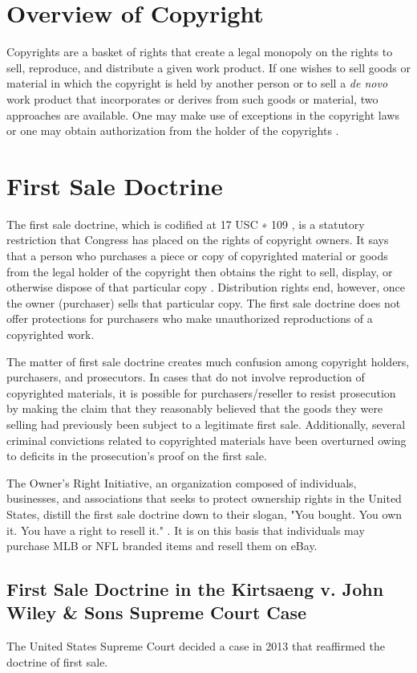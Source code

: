 \documentclass[letterpaper,11pt]{texMemo}
\begin{document}
\section*{Overview of Copyright}
  Copyrights are a basket of rights that create a legal monopoly on the rights to sell, reproduce, and distribute a given work product. If one wishes to sell goods or material in which the copyright is held by another person or to sell a \emph{de novo} work product that incorporates or derives from such goods or material, two approaches are available. One may make use of exceptions in the copyright laws or one may obtain authorization from the holder of the copyrights \cite{carnes}.

\section*{First Sale Doctrine}
  The first sale doctrine, which is codified at 17 USC \textsection∗ 109 \cite{17usc109}, is a statutory restriction that Congress has placed on the rights of copyright owners. It says that a person who purchases a piece or copy of copyrighted material or goods from the legal holder of the copyright then obtains the right to sell, display, or otherwise dispose of that particular copy \cite{crm1854}. Distribution rights end, however, once the owner (purchaser) sells that particular copy. The first sale doctrine does not offer protections for purchasers who make unauthorized reproductions of a copyrighted work.

  The matter of first sale doctrine creates much confusion among copyright holders, purchasers, and prosecutors. In cases that do not involve reproduction of copyrighted materials, it is possible for purchasers/reseller to resist prosecution by making the claim that they reasonably believed that the goods they were selling had previously been subject to a legitimate first sale. Additionally, several criminal convictions related to copyrighted materials have been overturned owing to deficits in the prosecution's proof on the first sale.

  The Owner's Right Initiative, an organization composed of individuals, businesses, and associations that seeks to protect ownership rights in the United States, distill the first sale doctrine down to their slogan, "You bought. You own it. You have a right to resell it." \cite{ownersrights}. It is on this basis that individuals may purchase MLB or NFL branded items and resell them on eBay.

  \subsection*{First Sale Doctrine in the Kirtsaeng v. John Wiley \& Sons Supreme Court Case}
    The United States Supreme Court decided a case in 2013 that reaffirmed the doctrine of first sale.
\end{document}
